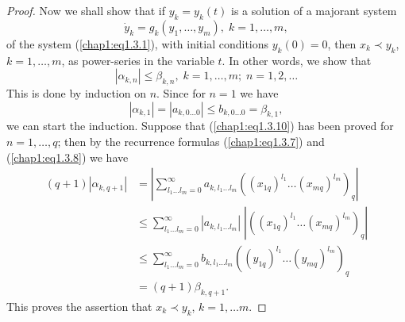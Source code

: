 \begin{proof}
Now we shall show that if $y_k= y_k (t)$ is a solution of a majorant system
\begin{equation*}
\dot{y}_k = g_k(y_1, \ldots, y_m), \; k = 1 , \ldots , m, \tag{1.3.9}\label{chap1:eq1.3.9}
\end{equation*}
of the system (\ref{chap1:eq1.3.1}), with initial conditions $y_k(0)=0$, then $x_k \prec y_k$, $k=1, \ldots, m$, as power-series in the variable $t$. In other words, we show that 
\begin{equation*}
|\alpha_{k,n}| \leq \beta_{k,n}, \; k =1 , \ldots, m; \; n = 1, 2, \ldots \tag{1.3.10}\label{chap1:eq1.3.10}
\end{equation*}\pageoriginale 
This is done by induction on $n$. Since for $n=1$ we have
$$
|\alpha_{k,1}| = |a_{k,0\ldots 0}| \leq b_{k, 0 \ldots 0} = \beta_{k,1}, 
$$
we can start the induction. Suppose that (\ref{chap1:eq1.3.10}) has been proved for $n=1, \ldots, q$; then by the recurrence formulas (\ref{chap1:eq1.3.7}) and (\ref{chap1:eq1.3.8}) we have
\begin{align*}
(q+1) |\alpha_{k, q+1}| & = |\sum\limits^\infty_{l_1 \ldots l_m = 0} a_{k,l_1 \ldots l_m} ((x_{1q})^{l_1} \ldots (x_{mq})^{l_m})_q| \\
& \leq \sum\limits^\infty_{l_1 \ldots l_m = 0} |a_{k,l_1 \ldots l_m}| \; |((x_{1q})^{l_1} \ldots (x_{mq})^{l_m})_q|\\
& \leq \sum\limits^\infty_{l_1 \ldots l_m =0} b_{k,l_1 \ldots l_m} ((y_{1q})^{l_1} \ldots (y_{mq})^{l_m})_q\\
& = (q+1) \beta_{k,q+1} .
\end{align*}
This proves the assertion that $x_k \prec y_k$, $k=1, \ldots m$.


\end{proof}
